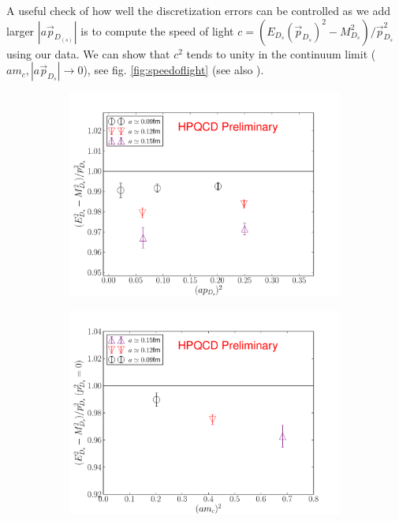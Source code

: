 A useful check of how well the discretization errors can be controlled as we add larger $|a\vec{p}_{D_{(s)}}|$ is to compute the speed of light $c = (E_{D_s}(\vec{p}_{D_s})^2 - M_{D_s}^2) / \vec{p}_{D_s}^2$ using our data. We can show that $c^2$ tends to unity in the continuum limit ($am_c,\left\vert a\vec{p}_{D_s} \right\vert\to 0$), see fig. \ref{fig:speedoflight} (see also \cite{Donald:2012ga}). 

\begin{figure}
\centering
\begin{subfigure}{.5\textwidth}
  \centering
  \includegraphics[width=1.0\linewidth]{images/c2_proceedings17.pdf}
  \label{fig:sub1}
\end{subfigure}%
\begin{subfigure}{.5\textwidth}
  \centering
  \includegraphics[width=1.0\linewidth]{images/c2p0_proceedings17.pdf}

\end{subfigure}
\end{figure}
